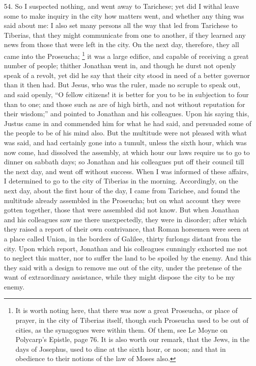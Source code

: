 54. So I suspected nothing, and went away to Tarichese; yet did I withal
leave some to make inquiry in the city how matters went, and whether any
thing was said about me: I also set many persons all the way that led from
Tarichese to Tiberias, that they might communicate from one to another, if
they learned any news from those that were left in the city. On the next
day, therefore, they all came into the Proseucha; \footnote{It is worth noting here,
that there was now a great Proseucha, or place of prayer, in the city of
Tiberias itself, though such Proseucha used to be out of cities, as the
synagogues were within them. Of them, see Le Moyne on Polycarp's Epistle,
page 76. It is also worth our remark, that the Jews, in the days of
Josephus, used to dine at the sixth hour, or noon; and that in obedience
to their notions of the law of Moses also.} it was a
large edifice, and capable of receiving a great number of people; thither
Jonathan went in, and though he durst not openly speak of a revolt, yet
did he say that their city stood in need of a better governor than it then
had. But Jesus, who was the ruler, made no scruple to speak out, and said
openly, ``O fellow citizens! it is better for you to be in subjection to
four than to one; and those such as are of high birth, and not without
reputation for their wisdom;'' and pointed to Jonathan and his colleagues.
Upon his saying this, Justus came in and commended him for what he had
said, and persuaded some of the people to be of his mind also. But the
multitude were not pleased with what was said, and had certainly gone into
a tumult, unless the sixth hour, which was now come, had dissolved the
assembly, at which hour our laws require us to go to dinner on sabbath
days; so Jonathan and his colleagues put off their council till the next
day, and went off without success. When I was informed of these affairs, I
determined to go to the city of Tiberias in the morning. Accordingly, on
the next day, about the first hour of the day, I came from Tarichee, and
found the multitude already assembled in the Proseucha; but on what
account they were gotten together, those that were assembled did not know.
But when Jonathan and his colleagues saw me there unexpectedly, they were
in disorder; after which they raised a report of their own contrivance,
that Roman horsemen were seen at a place called Union, in the borders of
Galilee, thirty furlongs distant from the city. Upon which report,
Jonathan and his colleagues cunningly exhorted me not to neglect this
matter, nor to suffer the land to be spoiled by the enemy. And this they
said with a design to remove me out of the city, under the pretense of the
want of extraordinary assistance, while they might dispose the city to be
my enemy.

